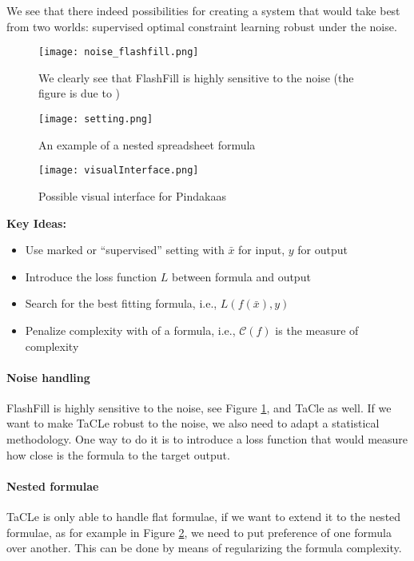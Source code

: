 We see that there indeed possibilities for creating a system that
would take best from two worlds: supervised optimal constraint
learning robust under the noise.

\begin{figure}[htb]
 \centering
 \texttt{[image: noise\_flashfill.png]}
 \caption{We clearly see that FlashFill is highly sensitive to the
   noise (the figure is due to \cite{robustfill})}
  \label{fig:flashfill_noise}
\end{figure}

\begin{figure}[htb]
 \centering
 \texttt{[image: setting.png]}
 \caption{An example of a nested spreadsheet formula}
  \label{fig:nested_formula}
\end{figure}

\begin{figure}[htb]
 \centering
 \texttt{[image: visualInterface.png]}
 \caption{Possible visual interface for Pindakaas}
  \label{fig:visual_interface}
\end{figure}

\textbf{Key Ideas:}
  \begin{itemize}
    \item Use marked or ``supervised'' setting with $\bar x$ for input, $y$ for output
    \item Introduce the loss function $L$ between formula and output
    \item Search for the best fitting formula, i.e., $L(f(\bar x),y)$
    \item Penalize complexity with of a formula, i.e., $\mathcal{C}(f)$ is the measure of complexity
  \end{itemize}

\paragraph{Noise handling} FlashFill is highly sensitive to the noise,
see Figure \ref{fig:flashfill_noise},
and TaCle as well. If we want to make TaCLe robust to the noise, we also need to adapt a
statistical methodology. One way to do it is to introduce a loss
function that would measure how close is the formula to the target
output.

\paragraph{Nested formulae} TaCLe is only able to handle flat
formulae, if we want to extend it to the nested formulae, as for
example in Figure \ref{fig:nested_formula}, we need to
put preference of one formula over another. This can be done by means
of regularizing the formula complexity.

